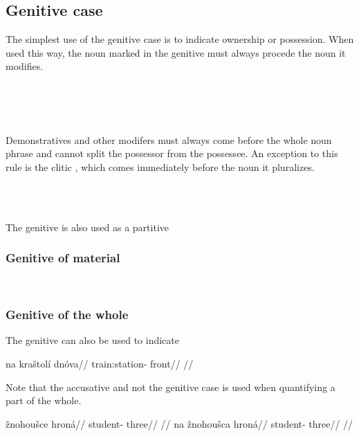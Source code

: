 \subsection{Genitive case}\label{sec:genitive-case}

The simplest use of the genitive case is to indicate ownership or possession.
When used this way, the noun marked in the genitive must always procede the noun
it modifies.

\pex
{}\\
\\
\\
\xe

Demonstratives and other modifers must always come before
the whole noun phrase and cannot split the possessor from the possessee. An
exception to this rule is the clitic , which comes immediately before
the noun it pluralizes.

\pex
\a  {}\\
\a  {}\\
\xe

The genitive is also used as a partitive 


\subsubsection{Genitive of material}

\ex
{}\\
\xe

\subsubsection{Genitive of the whole}
The genitive can also be used to indicate

\pex
\begingl
\gla na kraštolí dnóva//
\glb \Loc{} train:station-\Gen{} front//
\glft {}//
\endgl
\xe

Note that the accusative and not the genitive case is used when quantifying a part of the whole.

\pex
\a
\begingl
\gla *žnohoušce hroná//
\glb student-\Gen{} three//
\glft {}//
\endgl
\a
\begingl
\gla na žnohoušca hroná//
\glb \Loc{} student-\Gen{} three//
\glft {}//
\endgl
\xe

